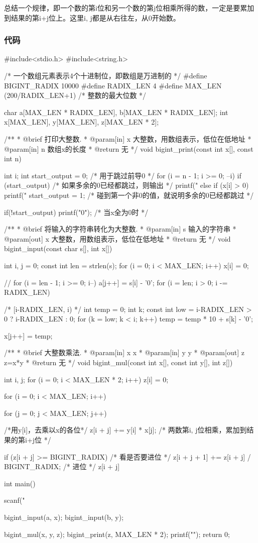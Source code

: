总结一个规律，即一个数的第i位和另一个数的第j位相乘所得的数，一定是要累加到结果的第i+j位上。这里i, j都是从右往左，从0开始数。

\subsubsection{代码}
\begin{Codex}[label=bigint_mul.c]
#include<stdio.h>
#include<string.h>

/* 一个数组元素表示4个十进制位，即数组是万进制的 */
#define BIGINT_RADIX 10000
#define RADIX_LEN 4
#define MAX_LEN (200/RADIX_LEN+1)  /* 整数的最大位数 */

char    a[MAX_LEN * RADIX_LEN], b[MAX_LEN * RADIX_LEN];
int     x[MAX_LEN], y[MAX_LEN], z[MAX_LEN * 2];

/**
 * @brief 打印大整数.
 * @param[in] x 大整数，用数组表示，低位在低地址
 * @param[in] n 数组x的长度
 * @return 无
 */
void bigint_print(const int x[], const int n) {
    int i;
    int start_output = 0;  /* 用于跳过前导0 */
    for (i = n - 1; i >= 0; --i) {
        if (start_output) {  /* 如果多余的0已经都跳过，则输出 */
            printf("%
        } else if (x[i] > 0) {
            printf("%
            start_output = 1; /* 碰到第一个非0的值，就说明多余的0已经都跳过 */
        }
    }

    if(!start_output) printf("0");  /* 当x全为0时 */
}

/**
 * @brief 将输入的字符串转化为大整数.
 * @param[in] s 输入的字符串
 * @param[out] x 大整数，用数组表示，低位在低地址
 * @return 无
 */
void bigint_input(const char s[], int x[]) {
    int i, j = 0;
    const int len = strlen(s);
    for (i = 0; i < MAX_LEN; i++) x[i] = 0;

    // for (i = len - 1; i >= 0; i--) a[j++] = s[i] - '0';
    for (i = len; i > 0; i -= RADIX_LEN) {  /* [i-RADIX_LEN, i) */
        int temp = 0;
        int k;
        const int low = i-RADIX_LEN > 0 ? i-RADIX_LEN : 0;
        for (k = low; k < i; k++) {
            temp = temp * 10 + s[k] - '0';
        }

        x[j++] = temp;
    }
}

/**
 * @brief 大整数乘法.
 * @param[in] x x
 * @param[in] y y
 * @param[out] z z=x*y
 * @return 无
 */
void bigint_mul(const int x[], const int y[], int z[]) {
    int i, j;
    for (i = 0; i < MAX_LEN * 2; i++) z[i] = 0;

    for (i = 0; i < MAX_LEN; i++) {
        for (j = 0; j < MAX_LEN; j++) { /*用y[i]，去乘以x的各位*/
            z[i + j] += y[i] * x[j]; /* 两数第i, j位相乘，累加到结果的第i+j位 */

            if (z[i + j] >= BIGINT_RADIX) { /* 看是否要进位 */
                z[i + j + 1] += z[i + j] / BIGINT_RADIX; /* 进位 */
                z[i + j] %
            }
        }
    }
}


int main() {
    scanf("%

    bigint_input(a, x);
    bigint_input(b, y);

    bigint_mul(x, y, z);
    bigint_print(z, MAX_LEN * 2);
    printf("\n");
    return 0;
}
\end{Codex}

